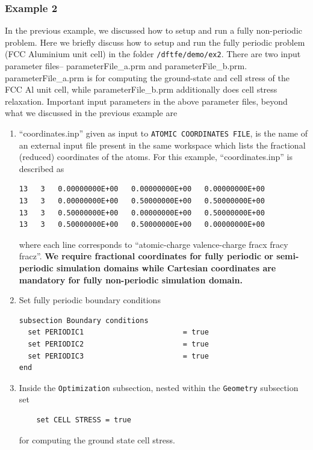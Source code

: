 \subsubsection{Example 2}\label{sec:example2}
In the previous example, we discussed how to setup and run a fully non-periodic problem.
Here we briefly discuss how to setup and run the fully periodic problem (FCC Aluminium unit cell) in the folder
\verb|/dftfe/demo/ex2|. There are two input parameter files-- parameterFile\_a.prm and parameterFile\_b.prm. parameterFile\_a.prm is
for computing the ground-state and cell stress of the FCC Al unit cell, while parameterFile\_b.prm additionally does cell stress relaxation.  
Important input parameters in the above parameter files, beyond what we discussed in the previous example are
\begin{enumerate}
\item ``coordinates.inp'' given as input to \verb|ATOMIC COORDINATES FILE|, is the name of an external input file present in the same workspace which lists the fractional (reduced) coordinates of the atoms. For this example, ``coordinates.inp'' is described as 
\begin{verbatim}
13   3   0.00000000E+00   0.00000000E+00   0.00000000E+00
13   3   0.00000000E+00   0.50000000E+00   0.50000000E+00
13   3   0.50000000E+00   0.00000000E+00   0.50000000E+00
13   3   0.50000000E+00   0.50000000E+00   0.00000000E+00
\end{verbatim}
where each line corresponds to ``atomic-charge valence-charge fracx fracy fracz''. {\bf We require fractional coordinates for fully periodic or semi-periodic simulation domains while Cartesian coordinates are mandatory for fully non-periodic simulation domain.}
\item Set fully periodic boundary conditions
\begin{verbatim}	
subsection Boundary conditions
  set PERIODIC1                       = true
  set PERIODIC2                       = true
  set PERIODIC3                       = true
end
\end{verbatim}

\item Inside the \verb|Optimization| subsection, nested within the \verb|Geometry| subsection set 
\begin{verbatim}	
    set CELL STRESS = true
\end{verbatim}	
for computing the ground state cell stress. 


\end{enumerate}
